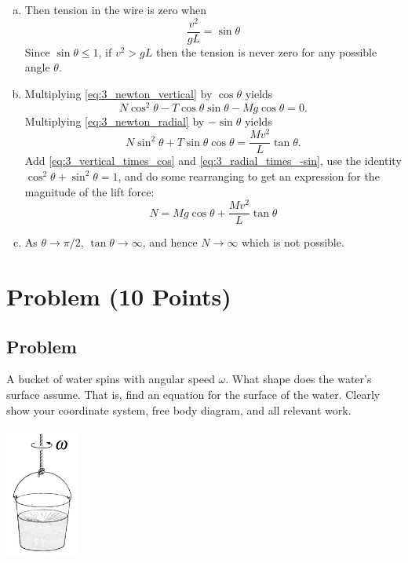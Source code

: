 \documentclass[solutions]{esg8012exam}
\begin{document}
\begin{enumerate}[(a)]
    \item Then tension in the wire is zero when
      \begin{equation}
        \frac{v^2}{g L} = \sin\theta
      \end{equation}
      Since $\sin\theta \le 1$, if $v^2 > gL$ then the tension is never zero for any possible angle $\theta$.
    \item Multiplying \autoref{eq:3_newton_vertical} by $\cos\theta$ yields
      \begin{equation}
        N \cos^2\theta - T\cos\theta\sin\theta - M g \cos\theta = 0. \label{eq:3_vertical_times_cos}
      \end{equation}
      Multiplying \autoref{eq:3_newton_radial} by $-\sin\theta$ yields
      \begin{equation}
        N \sin^2\theta + T\sin\theta\cos\theta = \frac{M v^2}{L}\tan\theta. \label{eq:3_radial_times_-sin}
      \end{equation}
      Add \autoref{eq:3_vertical_times_cos} and \autoref{eq:3_radial_times_-sin}, use the identity $\cos^2\theta + \sin^2\theta = 1$, and do some rearranging to get an expression for the magnitude of the lift force:
      \begin{equation}
        N = M g \cos\theta + \frac{M v^2}{L} \tan\theta
      \end{equation}
    \item As $\theta \to \pi / 2$, $\tan\theta \to \infty$, and hence $N \to \infty$ which is not possible.
  \end{enumerate}
\clearpage
\section{Problem \thesection\space(10 Points)}
\subsection{Problem}
  A bucket of water spins with angular speed $\omega$.  What shape does the water's surface assume.  That is, find an equation for the surface of the water.  Clearly show your coordinate system, free body diagram, and all relevant work.
  \begin{center}
    \includegraphics[width=0.18\textwidth]{exam1_p4_1}
  \end{center}
\end{document}
